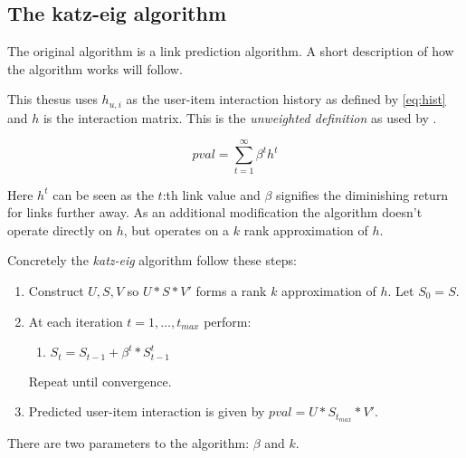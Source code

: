 \subsection{The katz-eig algorithm}\label{sec:background:theory:katzeig}

The original algorithm \cite{katz1953new} is a link prediction algorithm. A short description of how the algorithm works will follow.


This thesus uses $h_{u, i}$ as the user-item interaction history as defined by \ref{eq:hist} and $h$ is the interaction matrix. This is the \textit{unweighted definition} as used by \cite{liben2007link}.



\begin{equation}
    \mathit{pval} = \sum_{t=1}^{\infty} \beta^t h^t
\end{equation}

Here $h^t$ can be seen as the $t$:th link value and $\beta$ signifies the diminishing return for links further away.  As an additional modification the algorithm doesn't operate directly on $h$, but operates on a $k$ rank approximation of $h$.


Concretely the \textit{katz-eig} algorithm follow these steps:

\begin{enumerate}
    \item Construct $U, S, V$ so $U * S * V'$ forms a rank $k$ approximation of $h$. Let $S_0 = S$.

    \item At each iteration $t = 1, \ldots, t_{max}$ perform:

        \begin{enumerate}
            \item $S_t = S_{t - 1} + \beta^t * S_{t - 1}^t$
        \end{enumerate}

        Repeat until convergence.

    \item Predicted user-item interaction is given by $\mathit{pval} = U * S_{t_{max}} * V'$.

\end{enumerate}

There are two parameters to the algorithm: $\beta$ and $k$.

